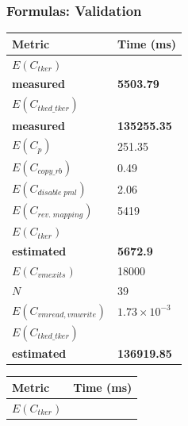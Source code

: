 \documentclass[xcolor=table,bigger,unknownkeysallowed]{beamer}
\begin{document}
        \begin{frame}
            \frametitle{Formulas: Validation}
			\begin{table}[h]
				\centering \scriptsize
				\begin{subtable}[b]{.45\textwidth}
					\centering 
					\begin{tabular}{l l}
						\toprule
						\hline
						Metric & Time (ms) \\
						\hline
						\textcolor{americanrose}{\textbf{$E(C_{tker})$}} & \\
						\textcolor{americanrose}{\textbf{measured}} & \multirow{-2}{*}{\textcolor{americanrose}{\textbf{5503.79}}}\\
						\textcolor{airforceblue}{\textbf{$E(C_{tked\_tker})$}} & \\
						\textcolor{airforceblue}{\textbf{measured}} & \multirow{-2}{*}{\textcolor{airforceblue}{\textbf{135255.35}}}\\
						\midrule
						$E(C_{p})$ & 251.35\\
						$E(C_{copy\_rb})$ & 0.49\\
						$E(C_{disable \; pml})$ & 2.06\\
						$E(C_{rev. \; mapping})$ & 5419 \\
						\textcolor{americanrose}{\textbf{$E(C_{tker})$}}  &\\
						\textcolor{americanrose}{\textbf{estimated}} &  \multirow{-2}{*}{\textcolor{americanrose}{\textbf{5672.9}}}\\
						\midrule
						$E(C_{vmexits})$ & 18000\\
						$N$ & 39\\
						$E(C_{vmread,vmwrite})$ & $1.73 \times 10^{-3}$\\
						\textcolor{airforceblue}{\textbf{$E(C_{tked\_tker})$}}  & \\
						\textcolor{airforceblue}{\textbf{estimated}} & \multirow{-2}{*}{\textcolor{airforceblue}{\textbf{136919.85}}}\\
						\bottomrule
					\end{tabular}
					\label{tab:criu-spml-formula}
				\end{subtable}
				\hfill
				\begin{subtable}[b]{.45\textwidth}
					\centering 
					\begin{tabular}{l l}
						\toprule
						\hline
						Metric & Time (ms) \\
						\hline
						\textcolor{americanrose}{\textbf{$E(C_{tker})$}} & \\

\end{tabular}
\end{subtable}
\end{table}
\end{frame}
\end{document}
